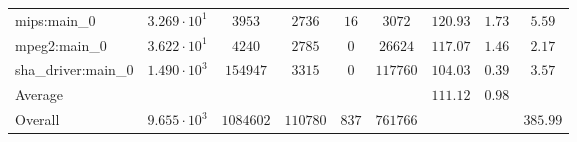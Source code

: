 \begin{tabular}{|l|c|c|c|c|c|c|c|c|}
mips:main\_0            & $ 3.269 \cdot 10^{1} $ & $ 3953    $ & $ 2736   $ & $ 16  $ & $ 3072   $ & $ 120.93      $ & $ 1.73    $ & $ 5.59    $ \\
mpeg2:main\_0           & $ 3.622 \cdot 10^{1} $ & $ 4240    $ & $ 2785   $ & $ 0   $ & $ 26624  $ & $ 117.07      $ & $ 1.46    $ & $ 2.17    $ \\
sha\_driver:main\_0     & $ 1.490 \cdot 10^{3} $ & $ 154947  $ & $ 3315   $ & $ 0   $ & $ 117760 $ & $ 104.03      $ & $ 0.39    $ & $ 3.57    $ \\
\hline
Average                 & $                    $ & $         $ & $        $ & $     $ & $        $ & $ 111.12      $ & $ 0.98    $ & $         $ \\
\hline
Overall                 & $ 9.655 \cdot 10^{3} $ & $ 1084602 $ & $ 110780 $ & $ 837 $ & $ 761766 $ & $             $ & $         $ & $ 385.99  $ \\
\hline
\end{tabular}
